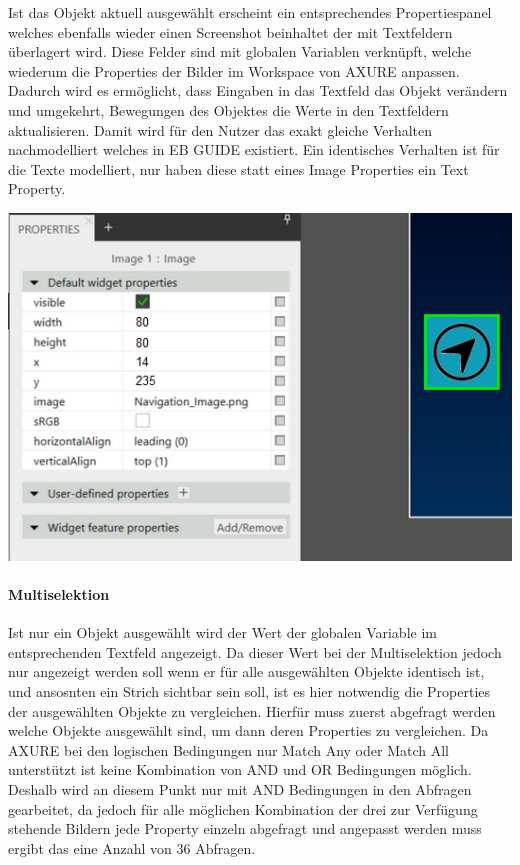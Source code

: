 Ist das Objekt aktuell ausgewählt erscheint ein entsprechendes Propertiespanel welches ebenfalls wieder einen Screenshot beinhaltet der mit Textfeldern überlagert wird.
Diese Felder sind mit globalen Variablen verknüpft, welche wiederum die Properties der Bilder im Workspace von AXURE anpassen.
Dadurch wird es ermöglicht, dass Eingaben in das Textfeld das Objekt verändern und umgekehrt, Bewegungen des Objektes die Werte in den Textfeldern aktualisieren.
Damit wird für den Nutzer das exakt gleiche Verhalten nachmodelliert welches in EB GUIDE existiert.
Ein identisches Verhalten ist für die Texte modelliert, nur haben diese statt eines Image Properties ein Text Property.

\begin{center}
  \includegraphics[scale=0.8]{figures/Prototyp_04.PNG}
  \label{fig:Prototyp_04}
\end{center}

\paragraph{Multiselektion}
Ist nur ein Objekt ausgewählt wird der Wert der globalen Variable im entsprechenden Textfeld angezeigt.
Da dieser Wert bei der Multiselektion jedoch nur angezeigt werden soll wenn er für alle ausgewählten Objekte identisch ist, und ansosnten ein Strich sichtbar sein soll, ist es hier notwendig die Properties der ausgewählten Objekte zu vergleichen.
Hierfür muss zuerst abgefragt werden welche Objekte ausgewählt sind, um dann deren Properties zu vergleichen.
Da AXURE bei den logischen Bedingungen nur \glqq Match Any\grqq{} oder \glqq Match All\grqq{} unterstützt ist keine Kombination von AND und OR Bedingungen möglich.
Deshalb wird an diesem Punkt nur mit AND Bedingungen in den Abfragen gearbeitet, da jedoch für alle möglichen Kombination der drei zur Verfügung stehende Bildern jede Property einzeln abgefragt und angepasst werden muss ergibt das eine Anzahl von 36 Abfragen.

